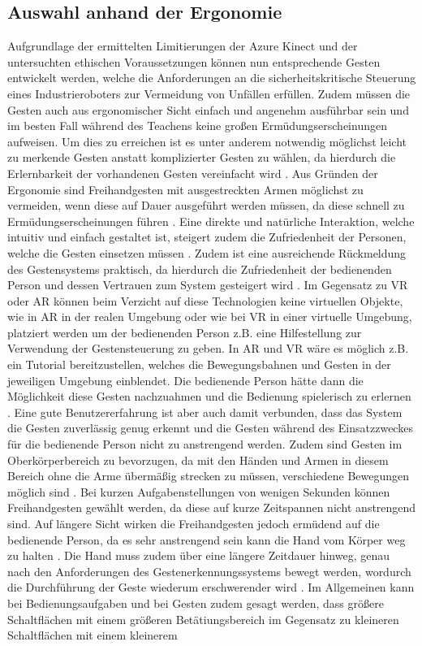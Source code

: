 \subsection{Auswahl anhand der Ergonomie}
Aufgrundlage der ermittelten Limitierungen der Azure Kinect und der untersuchten ethischen Voraussetzungen können nun entsprechende Gesten entwickelt werden, welche die Anforderungen an die sicherheitskritische Steuerung eines Industrieroboters zur Vermeidung von Unfällen erfüllen. Zudem müssen die Gesten auch aus ergonomischer Sicht einfach und angenehm ausführbar sein und im besten Fall während des Teachens keine großen Ermüdungserscheinungen aufweisen. Um dies zu erreichen ist es unter anderem notwendig möglichst leicht zu merkende Gesten anstatt komplizierter Gesten zu wählen, da hierdurch die Erlernbarkeit der vorhandenen Gesten vereinfacht wird \cite[97]{schleicher_einfuhrung_2020}. Aus Gründen der Ergonomie sind Freihandgesten mit ausgestreckten Armen möglichst zu vermeiden, wenn diese auf Dauer ausgeführt werden müssen, da diese schnell zu Ermüdungserscheinungen führen \cite[84]{neupert_naturliche_nodate}. Eine direkte und natürliche Interaktion, welche intuitiv und einfach gestaltet ist, steigert zudem die Zufriedenheit der Personen, welche die Gesten einsetzen müssen \cite[103]{schleicher_einfuhrung_2020}. Zudem ist eine ausreichende Rückmeldung des Gestensystems praktisch, da hierdurch die Zufriedenheit der bedienenden Person und dessen Vertrauen zum System gesteigert wird \cite[132\psq]{schleicher_einfuhrung_2020}. Im Gegensatz zu VR oder AR können beim Verzicht auf diese Technologien keine virtuellen Objekte, wie in AR in der realen Umgebung oder wie bei VR in einer virtuelle Umgebung, platziert werden um der bedienenden Person z.B. eine Hilfestellung zur Verwendung der Gestensteuerung zu geben. In AR und VR wäre es möglich z.B. ein Tutorial bereitzustellen, welches die Bewegungsbahnen und Gesten in der jeweiligen Umgebung einblendet. Die bedienende Person hätte dann die Möglichkeit diese Gesten nachzuahmen und die Bedienung spielerisch zu erlernen \cite{weidenhausen_mobile_2007}. Eine gute Benutzererfahrung ist aber auch damit verbunden, dass das System die Gesten zuverlässig genug erkennt und die Gesten während des Einsatzzweckes für die bedienende Person nicht zu anstrengend werden. Zudem sind Gesten im Oberkörperbereich zu bevorzugen, da mit den Händen und Armen in diesem Bereich ohne die Arme übermäßig strecken zu müssen, verschiedene Bewegungen möglich sind \cite{nowack_pdf_2017}. Bei kurzen Aufgabenstellungen von wenigen Sekunden können Freihandgesten gewählt werden, da diese auf kurze Zeitspannen nicht anstrengend sind. Auf längere Sicht wirken die Freihandgesten jedoch ermüdend auf die bedienende Person, da es sehr anstrengend sein kann die Hand vom Körper weg zu halten \cite{krammling_user_2018}. Die Hand muss zudem über eine längere Zeitdauer hinweg, genau nach den Anforderungen des Gestenerkennungssystems bewegt werden, wordurch die Durchführung der Geste wiederum erschwerender wird \cite{erickjpaul_komfort_nodate}. Im Allgemeinen kann bei Bedienungsaufgaben und bei Gesten zudem gesagt werden, dass größere Schaltflächen mit einem größeren Betätiungsbereich im Gegensatz zu kleineren Schaltflächen mit einem kleinerem 